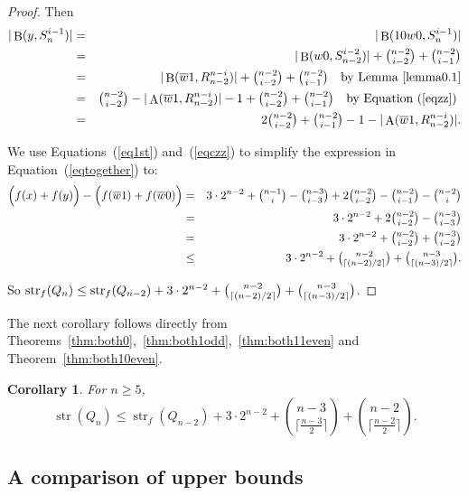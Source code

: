 \documentclass[12pt]{article}
\newtheorem{corollary}[theorem]{Corollary}
\DeclareMathOperator{\str}{str}
\DeclareMathOperator{\Succ}{A}
\DeclareMathOperator{\Prec}{B}
\begin{document}
\begin{proof}
Then \begin{eqnarray} |\Prec(y,S_{n}^{i-1})| &=& |\Prec(10w0,S_{n}^{i-1})| \nonumber \\  
&=& |\Prec(w0,S_{n-2}^{i-2})|+\tbinom{n-2}{i-2}+\tbinom{n-2}{i-1} \nonumber \\
&=& |\Prec(\overline{w}1,R_{n-2}^{n-i})|+\tbinom{n-2}{i-2}+\tbinom{n-2}{i-1} ~~~\text{by Lemma~\ref{lemma0.1}}\nonumber \\
&=& \tbinom{n-2}{i-2}-|\Succ(\overline{w}1,R_{n-2}^{n-i})|-1+\tbinom{n-2}{i-2}+\tbinom{n-2}{i-1} ~~~\text{by Equation~(\ref{eqzz}) \nonumber}\\
&=& 2\tbinom{n-2}{i-2}+\tbinom{n-2}{i-1}-1-|\Succ(\overline{w}1,R_{n-2}^{n-i})|.\label{eqczz}
\end{eqnarray}



We use Equations~(\ref{eq1st}) and~(\ref{eqczz}) to simplify the expression in Equation~(\ref{eqtogether}) to:
\begin{eqnarray*} \Big(f(x)+f(y)\Big) - \Big(f(\overline{w}1)+f(\overline{w}0)\Big) &=& 3 \cdot 2^{n-2} + \tbinom{n-1}{i}-\tbinom{n-3}{i-3}+2\tbinom{n-2}{i-2}-\tbinom{n-2}{i-1}-\tbinom{n-2}{i}\\ 
&=& 3 \cdot 2^{n-2} + 2\tbinom{n-2}{i-2}-\tbinom{n-3}{i-3} \\ &=& 3 \cdot 2^{n-2} +\tbinom{n-2}{i-2}+\tbinom{n-3}{i-2} \\ &\leq& 3 \cdot 2^{n-2} + \tbinom{n-2}{\lceil (n-2)/2\rceil }+\tbinom{n-3}{\lceil (n-3)/2\rceil}.\end{eqnarray*}

So $\str_f(Q_{n}) \leq \str_f(Q_{n-2}) + 3 \cdot 2^{n-2} +\tbinom{n-2}{\lceil (n-2)/2\rceil }+\tbinom{n-3}{\lceil (n-3)/2\rceil}$.
\end{proof}

The next corollary follows directly from Theorems~\ref{thm:both0},~\ref{thm:both1odd},~\ref{thm:both11even} and Theorem~\ref{thm:both10even}.

\begin{corollary}\label{cor:recurrence} For $n \geq 5$, $$ \str(Q_{n}) \leq \str_f(Q_{n-2})+3 \cdot 2^{n-2} + \binom{n-3}{\big\lceil \tfrac{n-3}{2}\big\rceil}+\binom{n-2}{\big\lceil \tfrac{n-2}{2}\big\rceil}.$$\end{corollary}


\subsection{A comparison of upper bounds} 
\end{document}
